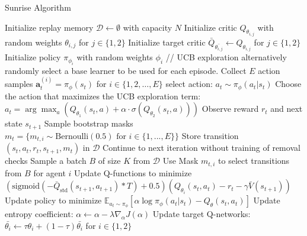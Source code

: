 \begin{algorithm}[H]
\caption{Sunrise Algorithm}
\label{alg:SUNRISE}
\begin{algorithmic}[1]
\State Initialize replay memory $\mathcal{D} \leftarrow \emptyset$ with capacity $N$
    \State Initialize critic $Q_{\theta_{i,j}}$ with random weights $\theta_{i,j}$ for $j \in \{1,2\}$
    \State Initialize target critic $\bar{Q}_{\bar{\theta_{i,j}}} \leftarrow Q_{\theta_{i,j}}$ for $j \in \{1,2\}$
    \State Initialize policy $\pi_{\phi_i}$ with random weights $\phi_i$
\EndFor
\Repeat
        \State // UCB exploration alternatively randomly select a base learner to be used for each episode.
        \State Collect $E$ action samples $\bm{a}_{t}^{(i)} = \pi_{\phi}(s_{t})$ for $i \in \{1,2,\ldots,E\}$
        \State select action: $a_{t} \sim \pi_{\phi}(a_{t} | s_{t})$
        \State Choose the action that maximizes the UCB exploration term:
        \State $a_{t} = \arg\max_{a} \left( Q_{\theta_1}(s_{t}, a) + \alpha \cdot \sigma(Q_{\theta_2}(s_{t}, a)) \right)$
        \State Observe reward $r_{t}$ and next state $s_{t+1}$
        \State Sample bootstrap masks $m_{t} = \{m_{t,i} \sim \text{Bernoulli}(0.5) \text{ for } i \in \{1,..., E\}\}$
        \State Store transition $(s_{t}, a_{t}, r_{t}, s_{t+1}, m_t)$ in $\mathcal{D}$
    \EndFor
        \State Continue to next iteration without training of removal checks
    \EndIf
        \State Sample a batch $B$ of size $K$ from $\mathcal{D}$
            \State Use Mask $m_{t,i}$ to select transitions from $B$ for agent $i$
            \State Update Q-functions to minimize $(\text{sigmoid}(-\bar{Q}_{\text{std}}(s_{t+1}, a_{t+1})*T)+0.5)(Q_{\theta_i}(s_t, a_t)-r_t-\gamma \bar{V}(s_{t+1}))$
            \State Update policy to minimize $\mathbb{E}_{a_t \sim \pi_\phi}\left[ \alpha \log \pi_\phi (a_t|s_t) - Q_\theta(s_t, a_t)\right]$
            \State Update entropy coefficient: $\alpha \gets \alpha - \lambda \hat{\nabla}_{\alpha} J(\alpha)$
            \State Update target Q-networks: $\bar{\theta_{i}} \gets \tau\theta_{i} + (1 - \tau) \bar{\theta_{i}}$ for $i \in \{1,2\}$
        \EndFor
    \EndFor
{}

\end{algorithmic}
\end{algorithm}
